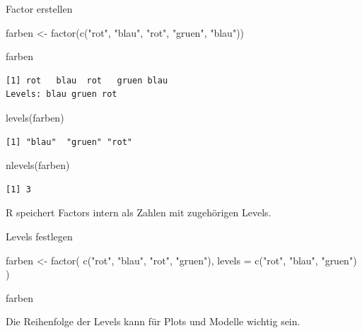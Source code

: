 \documentclass[
  10pt,
  ignorenonframetext,
  aspectratio=169,
]{beamer}
\newenvironment{Shaded}{}{}
\newcommand{\AttributeTok}[1]{\textcolor[rgb]{0.49,0.56,0.16}{#1}}
\newcommand{\FunctionTok}[1]{\textcolor[rgb]{0.02,0.16,0.49}{#1}}
\newcommand{\NormalTok}[1]{#1}
\newcommand{\OtherTok}[1]{\textcolor[rgb]{0.00,0.44,0.13}{#1}}
\newcommand{\StringTok}[1]{\textcolor[rgb]{0.25,0.44,0.63}{#1}}
\begin{document}
\begin{frame}[fragile]{Factor erstellen}
\label{factor-erstellen}
\begin{Shaded}
\begin{Highlighting}[]
\NormalTok{farben }\OtherTok{\textless{}{-}} \FunctionTok{factor}\NormalTok{(}\FunctionTok{c}\NormalTok{(}\StringTok{"rot"}\NormalTok{, }\StringTok{"blau"}\NormalTok{, }\StringTok{"rot"}\NormalTok{, }\StringTok{"gruen"}\NormalTok{, }\StringTok{"blau"}\NormalTok{))}

\NormalTok{farben}
\end{Highlighting}
\end{Shaded}

\begin{verbatim}
[1] rot   blau  rot   gruen blau 
Levels: blau gruen rot
\end{verbatim}

\begin{Shaded}
\begin{Highlighting}[]
\FunctionTok{levels}\NormalTok{(farben)}
\end{Highlighting}
\end{Shaded}

\begin{verbatim}
[1] "blau"  "gruen" "rot"  
\end{verbatim}

\begin{Shaded}
\begin{Highlighting}[]
\FunctionTok{nlevels}\NormalTok{(farben)}
\end{Highlighting}
\end{Shaded}

\begin{verbatim}
[1] 3
\end{verbatim}

R speichert Factors intern als Zahlen mit zugehörigen Levels.
\end{frame}

\begin{frame}[fragile]{Levels festlegen}
\label{levels-festlegen}
\begin{Shaded}
\begin{Highlighting}[]
\NormalTok{farben }\OtherTok{\textless{}{-}} \FunctionTok{factor}\NormalTok{(}
  \FunctionTok{c}\NormalTok{(}\StringTok{"rot"}\NormalTok{, }\StringTok{"blau"}\NormalTok{, }\StringTok{"rot"}\NormalTok{, }\StringTok{"gruen"}\NormalTok{),}
  \AttributeTok{levels =} \FunctionTok{c}\NormalTok{(}\StringTok{"rot"}\NormalTok{, }\StringTok{"blau"}\NormalTok{, }\StringTok{"gruen"}\NormalTok{)}
\NormalTok{)}

\NormalTok{farben}
\end{Highlighting}
\end{Shaded}

Die Reihenfolge der Levels kann für Plots und Modelle wichtig sein.
\end{frame}
\end{document}
